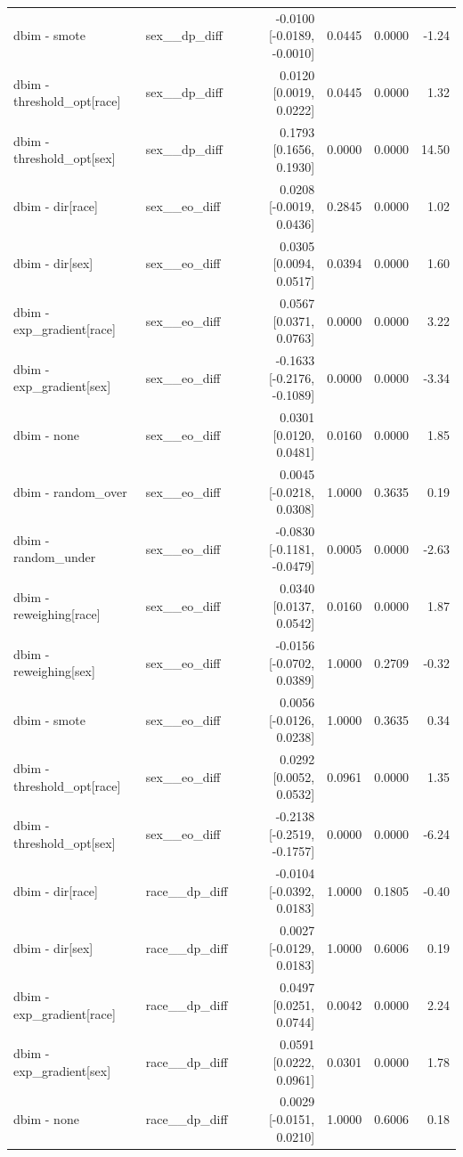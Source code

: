 \begin{table}[t]
{\begin{tabular}{llrrrr}
dbim - smote & sex\_\_dp\_diff & -0.0100 [-0.0189, -0.0010] & 0.0445 & 0.0000 & -1.24 \\
dbim - threshold\_opt[race] & sex\_\_dp\_diff & 0.0120 [0.0019, 0.0222] & 0.0445 & 0.0000 & 1.32 \\
dbim - threshold\_opt[sex] & sex\_\_dp\_diff & 0.1793 [0.1656, 0.1930] & 0.0000 & 0.0000 & 14.50 \\
dbim - dir[race] & sex\_\_eo\_diff & 0.0208 [-0.0019, 0.0436] & 0.2845 & 0.0000 & 1.02 \\
dbim - dir[sex] & sex\_\_eo\_diff & 0.0305 [0.0094, 0.0517] & 0.0394 & 0.0000 & 1.60 \\
dbim - exp\_gradient[race] & sex\_\_eo\_diff & 0.0567 [0.0371, 0.0763] & 0.0000 & 0.0000 & 3.22 \\
dbim - exp\_gradient[sex] & sex\_\_eo\_diff & -0.1633 [-0.2176, -0.1089] & 0.0000 & 0.0000 & -3.34 \\
dbim - none & sex\_\_eo\_diff & 0.0301 [0.0120, 0.0481] & 0.0160 & 0.0000 & 1.85 \\
dbim - random\_over & sex\_\_eo\_diff & 0.0045 [-0.0218, 0.0308] & 1.0000 & 0.3635 & 0.19 \\
dbim - random\_under & sex\_\_eo\_diff & -0.0830 [-0.1181, -0.0479] & 0.0005 & 0.0000 & -2.63 \\
dbim - reweighing[race] & sex\_\_eo\_diff & 0.0340 [0.0137, 0.0542] & 0.0160 & 0.0000 & 1.87 \\
dbim - reweighing[sex] & sex\_\_eo\_diff & -0.0156 [-0.0702, 0.0389] & 1.0000 & 0.2709 & -0.32 \\
dbim - smote & sex\_\_eo\_diff & 0.0056 [-0.0126, 0.0238] & 1.0000 & 0.3635 & 0.34 \\
dbim - threshold\_opt[race] & sex\_\_eo\_diff & 0.0292 [0.0052, 0.0532] & 0.0961 & 0.0000 & 1.35 \\
dbim - threshold\_opt[sex] & sex\_\_eo\_diff & -0.2138 [-0.2519, -0.1757] & 0.0000 & 0.0000 & -6.24 \\
dbim - dir[race] & race\_\_dp\_diff & -0.0104 [-0.0392, 0.0183] & 1.0000 & 0.1805 & -0.40 \\
dbim - dir[sex] & race\_\_dp\_diff & 0.0027 [-0.0129, 0.0183] & 1.0000 & 0.6006 & 0.19 \\
dbim - exp\_gradient[race] & race\_\_dp\_diff & 0.0497 [0.0251, 0.0744] & 0.0042 & 0.0000 & 2.24 \\
dbim - exp\_gradient[sex] & race\_\_dp\_diff & 0.0591 [0.0222, 0.0961] & 0.0301 & 0.0000 & 1.78 \\
dbim - none & race\_\_dp\_diff & 0.0029 [-0.0151, 0.0210] & 1.0000 & 0.6006 & 0.18 \\

\end{tabular}}
\end{table}
